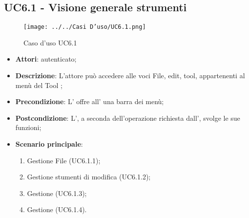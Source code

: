 \subsection{UC6.1 - Visione generale strumenti}
\label{ssec:UC6.1}
\begin{figure}[h!]
\centering
\texttt{[image: ../../Casi D'uso/UC6.1.png]}
\caption{Caso d'uso UC6.1}
 \end{figure}
\begin{itemize}
\item \textbf{Attori}:  autenticato;
\item \textbf{Descrizione}: L’attore può accedere alle voci File, edit, tool,
 appartenenti al menù del Tool ;
\item \textbf{Precondizione}: L’ offre all’ una barra dei menù;
\item \textbf{Postcondizione}: L’, a seconda dell’operazione richiesta dall’,
svolge le sue funzioni;
\item \textbf{Scenario principale}: \begin{enumerate}\item Gestione File (UC6.1.1);\item Gestione stumenti di modifica (UC6.1.2);\item Gestione  (UC6.1.3);\item Gestione  (UC6.1.4).
 \end{enumerate}
\end{itemize}
\newpage
